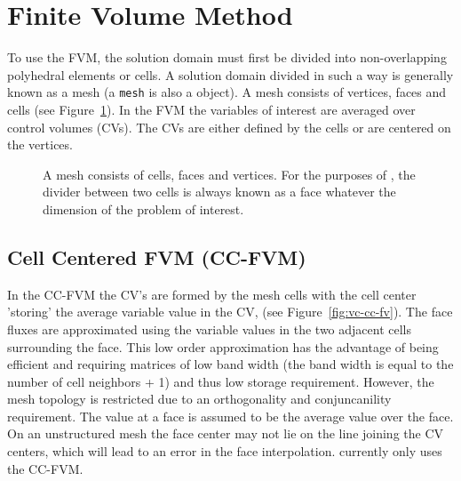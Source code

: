 \section{Finite Volume Method}

To use the FVM, the solution domain must first be divided into
non-overlapping polyhedral elements or cells. A solution domain
divided in such a way is generally known as a mesh (a \texttt{mesh} is
also a \FiPy{} object). A mesh consists of vertices, faces and cells
(see Figure~\ref{fig:meshcartoon}).  In the FVM the variables of
interest are averaged over control volumes (CVs). The CVs are either
defined by the cells or are centered on the vertices.

\begin{figure}
 \begin{center}
 \caption{A mesh consists of cells, faces and vertices. For the
 purposes of \FiPy{}, the divider between two cells is always known as
 a face whatever the dimension of the problem of interest.}
 \label{fig:meshcartoon} \end{center}
\end{figure}

\subsection{Cell Centered FVM (CC-FVM)}

In the CC-FVM the CV's are formed by the mesh cells with the cell
center 'storing' the average variable value in the CV, (see
Figure~\ref{fig:vc-cc-fv}). The face fluxes are approximated using the
variable values in the two adjacent cells surrounding the face. This
low order approximation has the advantage of being efficient and
requiring matrices of low band width (the band width is equal to the
number of cell neighbors + 1) and thus low storage
requirement. However, the mesh topology is restricted due to an
orthogonality and conjuncanility requirement. The value at a face is
assumed to be the average value over the face. On an unstructured mesh
the face center may not lie on the line joining the CV centers, which
will lead to an error in the face interpolation. \FiPy{} currently
only uses the CC-FVM.

